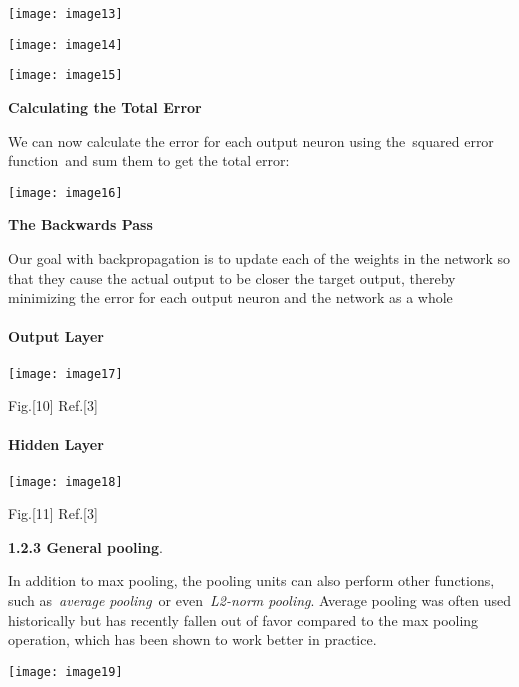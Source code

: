 \documentclass{article} %
\begin{document}
\noindent \texttt{[image: image13]}

\noindent \texttt{[image: image14]}

\noindent \texttt{[image: image15]}

\noindent \textbf{Calculating the Total Error}

\noindent We can now calculate the error for each output neuron using the~squared error function~and sum them to get the total error:

\noindent \texttt{[image: image16]}

\noindent \textbf{The Backwards Pass}

\noindent Our goal with backpropagation is to update each of the weights in the network so that they cause the actual output to be closer the target output, thereby minimizing the error for each output neuron and the network as a whole

\noindent 
\paragraph{Output Layer}

\noindent \texttt{[image: image17]}

\noindent Fig.[10]  Ref.[3]

\noindent 
\paragraph{Hidden Layer}

\noindent \texttt{[image: image18]}

\noindent Fig.[11]  Ref.[3]

\noindent 

\noindent \textbf{1.2.3 General pooling}. 

\noindent 

\noindent In addition to max pooling, the pooling units can also perform other functions, such as~\textit{average pooling}~or even~\textit{L2-norm pooling}. Average pooling was often used historically but has recently fallen out of favor compared to the max pooling operation, which has been shown to work better in practice.

\noindent \texttt{[image: image19]}
\end{document}
